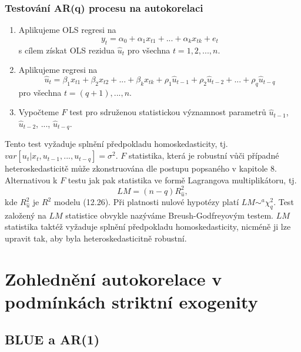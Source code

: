 \subsubsection{Testování AR(q) procesu na autokorelaci}

\begin{enumerate}
\item Aplikujeme OLS regresi na
\begin{equation}
y_t = \alpha_0 + \alpha_1 x_{t1} + ... + \alpha_k x_{tk} + e_t
\end{equation}
s cílem získat OLS rezidua $\hat{u}_t$ pro všechna $t = 1, 2, ..., n$.
\item Aplikujeme regresi na
\begin{equation}
\hat{u}_t = \beta_1 x_{t1} + \beta_2 x_{t2} + ... + \beta_k x_{tk} + \rho_1 \hat{u}_{t - 1} + \rho_2 \hat{u}_{t - 2} + ... + \rho_q \hat{u}_{t - q}
\end{equation}
pro všechna $t = (q + 1), ..., n$.
\item Vypočteme $F$ test pro sdruženou statistickou významnost parametrů $\hat{u}_{t - 1}$, $\hat{u}_{t - 2}$, ..., $\hat{u}_{t - q}$.
\end{enumerate}

Tento test vyžaduje splnění předpokladu homoskedasticity, tj. $var[u_t|x_t, u_{t-1}, ..., u_{t - q}] = \sigma^2$. $F$ statistika, která je robustní vůči případné heteroskedasticitě může zkonstruována dle postupu popsaného v kapitole 8. Alternativou k $F$ testu jak pak statistika ve formě Lagrangova multiplikátoru, tj.
\begin{equation}
LM = (n - q)R^2_{\hat{u}},
\end{equation}
kde $R^2_{\hat{u}}$ je $R^2$ modelu (12.26). Při platnosti nulové hypotézy platí $LM \sim^a \chi_q^2$. Test založený na $LM$ statistice obvykle nazýváme Breush-Godfreyovým testem. $LM$ statistika taktéž vyžaduje splnění předpokladu homoskedasticity, nicméně ji lze upravit tak, aby byla heteroskedasticitně robustní.

\section{Zohlednění autokorelace v podmínkách striktní exogenity}

\subsection{BLUE a AR(1)}

